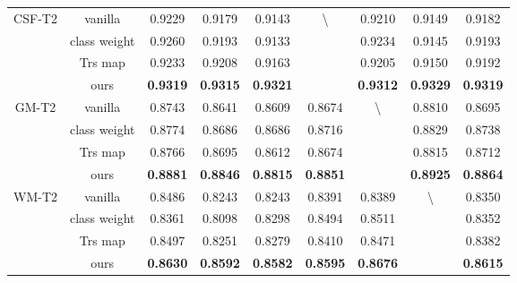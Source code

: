 \begin{table}
{\begin{tabular}{c|ccccccc|c}
\multirow{4}{*}{CSF-T2} & vanilla & 0.9229 & 0.9179 & 0.9143 & \multirow{4}{*}{\textbackslash} & 0.9210 & 0.9149 & 0.9182\\
 & class weight & 0.9260 & 0.9193 & 0.9133 &  & 0.9234 & 0.9145 & 0.9193\\
 & Trs map & 0.9233 & 0.9208 & 0.9163 &  & 0.9205 & 0.9150 & 0.9192\\
 & ours & {\bf 0.9319} & {\bf 0.9315} & {\bf 0.9321} &  & {\bf 0.9312} & {\bf 0.9329} & {\bf 0.9319}\\
\cmidrule{1-9}
\multirow{4}{*}{GM-T2} & vanilla & 0.8743 & 0.8641 & 0.8609 & 0.8674 & \multirow{4}{*}{\textbackslash} & 0.8810 & 0.8695\\
 & class weight & 0.8774 & 0.8686 & 0.8686 & 0.8716 &  & 0.8829 & 0.8738\\
 & Trs map & 0.8766 & 0.8695 & 0.8612 & 0.8674 &  & 0.8815 & 0.8712\\
 & ours & {\bf 0.8881} & {\bf 0.8846} & {\bf 0.8815} & {\bf 0.8851} &  & {\bf 0.8925} & {\bf 0.8864}\\
\cmidrule{1-9}
\multirow{4}{*}{WM-T2} & vanilla & 0.8486 & 0.8243 & 0.8243 & 0.8391 & 0.8389 & \multirow{4}{*}{\textbackslash} & 0.8350\\
 & class weight & 0.8361 & 0.8098 & 0.8298 & 0.8494 & 0.8511 &  & 0.8352\\
 & Trs map & 0.8497 & 0.8251 & 0.8279 & 0.8410 & 0.8471 &  & 0.8382\\
 & ours & {\bf 0.8630} & {\bf 0.8592} & {\bf 0.8582} & {\bf 0.8595} & {\bf 0.8676} &  & {\bf 0.8615}\\
\bottomrule
\end{tabular}
}
\vspace{-0.4cm}
\end{table}